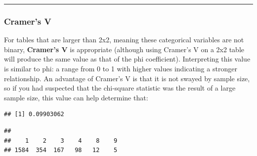 \documentclass[
]{book}
\newenvironment{Shaded}{\begin{snugshade}}{\end{snugshade}}
\newcommand{\CommentTok}[1]{\textcolor[rgb]{0.56,0.35,0.01}{\textit{#1}}}
\newcommand{\FunctionTok}[1]{\textcolor[rgb]{0.00,0.00,0.00}{#1}}
\newcommand{\NormalTok}[1]{#1}
\newcommand{\SpecialCharTok}[1]{\textcolor[rgb]{0.00,0.00,0.00}{#1}}
\begin{document}
\begin{center}\rule{0.5\linewidth}{0.5pt}\end{center}

\hypertarget{cramers-v}{%
\subsubsection{Cramer's V}\label{cramers-v}}

For tables that are larger than 2x2, meaning these categorical variables are not binary, \textbf{Cramer's V} is appropriate (although using Cramer's V on a 2x2 table will produce the same value as that of the phi coefficient). Interpreting this value is similar to phi: a range from 0 to 1 with higher values indicating a stronger relationship. An advantage of Cramer's V is that it is not swayed by sample size, so if you had suspected that the chi-square statistic was the result of a large sample size, this value can help determine that:

\begin{Shaded}
\end{Shaded}

\begin{verbatim}
## [1] 0.09903062
\end{verbatim}

\begin{Shaded}
\end{Shaded}

\begin{verbatim}
## 
##    1    2    3    4    8    9 
## 1584  354  167   98   12    5
\end{verbatim}
\end{document}
